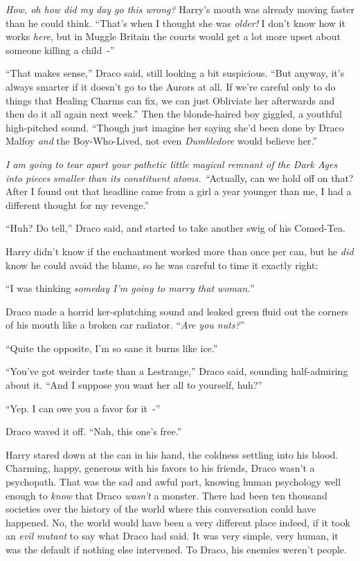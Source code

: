 \emph{How, oh how did my day go this wrong?} Harry's mouth was already moving faster than he could think. ``That's when I thought she was \emph{older!} I don't know how it works \emph{here}, but in Muggle Britain the courts would get a lot more upset about someone killing a child~-''

``That makes sense,'' Draco said, still looking a bit suspicious. ``But anyway, it's always smarter if it doesn't go to the Aurors at all. If we're careful only to do things that Healing Charms can fix, we can just Obliviate her afterwards and then do it all again next week.'' Then the blonde-haired boy giggled, a youthful high-pitched sound. ``Though just imagine her saying she'd been done by Draco Malfoy \emph{and} the Boy-Who-Lived, not even \emph{Dumbledore} would believe her.''

\emph{I am going to tear apart your pathetic little magical remnant of the Dark Ages into pieces smaller than its constituent atoms. ``}Actually, can we hold off on that? After I found out that headline came from a girl a year younger than me, I had a different thought for my revenge.''

``Huh? Do tell,'' Draco said, and started to take another swig of his Comed-Tea.

Harry didn't know if the enchantment worked more than once per can, but he \emph{did} know he could avoid the blame, so he was careful to time it exactly right:

``I was thinking \emph{someday I'm going to marry that woman.}''

Draco made a horrid ker-splutching sound and leaked green fluid out the corners of his mouth like a broken car radiator. ``\emph{Are you nuts?}''

``Quite the opposite, I'm so sane it burns like ice.''

``You've got weirder taste than a Lestrange,'' Draco said, sounding half-admiring about it. ``And I suppose you want her all to yourself, huh?''

``Yep. I can owe you a favor for it~-''

Draco waved it off. ``Nah, this one's free.''

Harry stared down at the can in his hand, the coldness settling into his blood. Charming, happy, generous with his favors to his friends, Draco wasn't a psychopath. That was the sad and awful part, knowing human psychology well enough to \emph{know} that Draco \emph{wasn't} a monster. There had been ten thousand societies over the history of the world where this conversation could have happened. No, the world would have been a very different place indeed, if it took an \emph{evil} \emph{mutant} to say what Draco had said. It was very simple, very human, it was the default if nothing else intervened. To Draco, his enemies weren't people.

